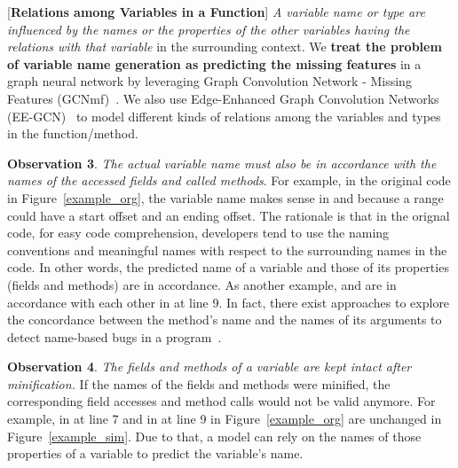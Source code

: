 \vspace{2pt}
 [{\bf Relations among Variables in a
    Function}] {\em A variable name or type are influenced by the
  names or the properties of the other variables having the relations
  with that variable} in the surrounding context. We {\bf treat the
  problem of variable name generation as predicting the missing
  features} in a graph neural network by leveraging Graph Convolution
Network - Missing Features (GCNmf)~\cite{GCNmf}.  We also use
Edge-Enhanced Graph Convolution Networks (EE-GCN)~\cite{ee-gcn} to
model different kinds of relations among the
variables and types in the function/method.



\vspace{2pt} \textbf{Observation 3}. {\em The actual variable name
  must also be in accordance with the names of the accessed fields and
  called methods}. For example, in the original code in
Figure~\ref{example_org}, the variable name  makes sense
in  and  because a range
could have a start offset and an ending offset. The rationale is that
in the orignal code, for easy code comprehension, developers tend to
use the naming conventions and meaningful names with respect to the
surrounding names in the code. In other words, the predicted name of a
variable and those of its properties (fields and methods) are in
accordance. As another example,  and
 are in accordance with each other in
 at line 9. In fact, there exist
approaches to explore the concordance between the method's name and
the names of its arguments to detect name-based bugs in a
program~\cite{deepbugs-oopsla18}.

\vspace{2pt}
\textbf{Observation 4}. {\em The fields and methods of a variable are
  kept intact after minification.} If the names of the fields and
methods were minified, the corresponding field accesses and method
calls would not be valid anymore. For example,  in
 at line 7 and  in
 at line 9 in Figure~\ref{example_org} are
unchanged in Figure~\ref{example_sim}. Due to that, a model can rely
on the names of those properties of a variable to predict the
variable's name.

